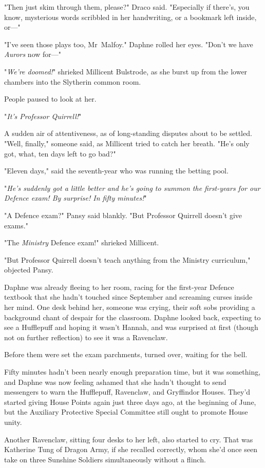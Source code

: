 "Then just skim through them, please?" Draco said. "Especially if there's, you
know, mysterious words scribbled in her handwriting, or a bookmark left inside,
or—"

"I've seen those plays too, Mr~Malfoy." Daphne rolled her eyes. "Don't we have
\emph{Aurors} now for—"

"\emph{We're doomed!}" shrieked Millicent Bulstrode, as she burst up from the
lower chambers into the Slytherin common room.

People paused to look at her.

"\emph{It's Professor Quirrell!}"

A sudden air of attentiveness, as of long-standing disputes about to be
settled. "Well, finally," someone said, as Millicent tried to catch her breath.
"He's only got, what, ten days left to go bad?"

"Eleven days," said the seventh-year who was running the betting pool.

"\emph{He's suddenly got a little better and he's going to summon the
first-years for our Defence exam! By surprise! In fifty minutes!}"

"A Defence exam?" Pansy said blankly. "But Professor Quirrell doesn't give
exams."

"The \emph{Ministry} Defence exam!" shrieked Millicent.

"But Professor Quirrell doesn't teach anything from the Ministry curriculum,"
objected Pansy.

Daphne was already fleeing to her room, racing for the first-year Defence
textbook that she hadn't touched since September and screaming curses inside
her mind.
\later
One desk behind her, someone was crying, their soft sobs providing a
background chant of despair for the classroom. Daphne looked back, expecting to
see a Hufflepuff and hoping it wasn't Hannah, and was surprised at first
(though not on further reflection) to see it was a Ravenclaw.

Before them were set the exam parchments, turned over, waiting for the bell.

Fifty minutes hadn't been nearly enough preparation time, but it was something,
and Daphne was now feeling ashamed that she hadn't thought to send messengers
to warn the Hufflepuff, Ravenclaw, and Gryffindor Houses. They'd started giving
House Points again just three days ago, at the beginning of June, but the
Auxiliary Protective Special Committee still ought to promote House unity.

Another Ravenclaw, sitting four desks to her left, also started to cry. That
was Katherine Tung of Dragon Army, if she recalled correctly, whom she'd once
seen take on three Sunshine Soldiers simultaneously without a flinch.

